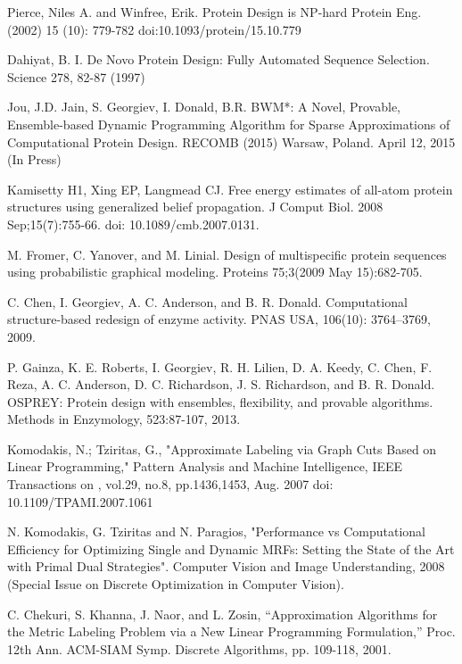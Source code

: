 \documentclass[11pt]{article}
\begin{document}
	\begin{thebibliography}{99}
	
	 Pierce, Niles A. and Winfree, Erik. Protein Design is NP-hard 
	Protein Eng. (2002) 15 (10): 779-782 doi:10.1093/protein/15.10.779
	
	 Dahiyat, B. I. De Novo Protein Design: Fully Automated Sequence
	Selection. Science 278, 82-87 (1997)	

	 Jou, J.D. Jain, S. Georgiev, I. Donald, B.R. BWM*: A Novel,
	Provable, Ensemble-based Dynamic Programming Algorithm for Sparse 
	Approximations of Computational Protein Design. RECOMB (2015) Warsaw, Poland.
	April 12, 2015 (In Press)

	 Kamisetty H1, Xing EP, Langmead CJ. Free energy estimates of
	all-atom protein structures using generalized belief propagation. J Comput
	Biol. 2008 Sep;15(7):755-66. doi: 10.1089/cmb.2007.0131.
		
	 M. Fromer, C. Yanover, and M. Linial. Design of multispecific
	protein sequences using probabilistic graphical modeling. Proteins 75;3(2009
	May 15):682-705.
	
	 C. Chen, I. Georgiev, A. C. Anderson, and B. R. Donald. 
	Computational structure-based redesign of enzyme activity. PNAS USA, 106(10):
	3764–3769, 2009.

	 P. Gainza, K. E. Roberts, I. Georgiev, R. H. Lilien, D. A. Keedy,
	C. Chen, F. Reza, A. C. Anderson, D. C. Richardson, J. S. Richardson, and B. R.
	Donald. OSPREY: Protein design with ensembles, flexibility, and provable
	algorithms. Methods in Enzymology, 523:87-107, 2013.
	
	 Komodakis, N.; Tziritas, G., "Approximate Labeling
	via Graph Cuts Based on Linear Programming," Pattern Analysis and Machine
	Intelligence, IEEE Transactions on , vol.29, no.8, pp.1436,1453, Aug. 2007
	doi: 10.1109/TPAMI.2007.1061	
	
	 N. Komodakis, G. Tziritas and N. Paragios, "Performance vs
	Computational Efficiency for Optimizing Single and Dynamic MRFs: Setting the 
	State of the Art with Primal Dual Strategies". Computer Vision and Image
	Understanding, 2008 (Special Issue on Discrete Optimization in Computer Vision).
	
	 C. Chekuri, S. Khanna, J. Naor, and L. Zosin, “Approximation
	Algorithms for the Metric Labeling Problem via a New Linear Programming
	Formulation,” Proc. 12th Ann. ACM-SIAM Symp. Discrete Algorithms, pp. 109-118,
	2001.
	
	\end{thebibliography}
\end{document}
